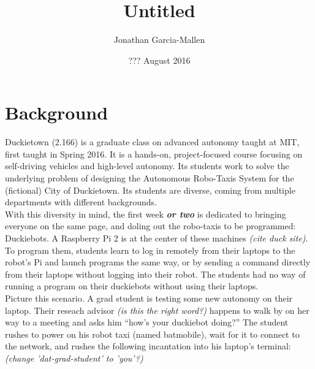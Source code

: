 \documentclass{article}
\title{Untitled}
\author{Jonathan Garcia-Mallen}
\date{??? August 2016}
\begin{document}
\lstset{language=Bash,
  numbers=left,
  stepnumber=3,    
  firstnumber=1,
  numberfirstline=true
}
\maketitle
\tableofcontents
\section{Background } 
Duckietown (2.166) is a graduate class on advanced autonomy taught at MIT, first taught in Spring 2016. It is a hands-on, project-focused course focusing on self-driving vehicles and high-level autonomy. Its students work to solve the underlying problem of designing the Autonomous Robo-Taxis System for the (fictional) City of Duckietown. Its students are diverse, coming from multiple departments with different backgrounds. 
\\
With this diversity in mind, the first week \textit{\textbf{or two}} is dedicated to bringing everyone on the same page, and doling out the robo-taxis to be programmed: Duckiebots. A Raspberry Pi 2 is at the center of these machines \textit{(cite duck site)}. To program them, students learn to log in remotely from their laptops to the robot's Pi and launch programs the same way, or by sending a command directly from their laptops without logging into their robot. The students had no way of running a program on their duckiebots without using their laptops.
\\
Picture this scenario. A grad student is testing some new autonomy on their laptop. Their reseach advisor \textit{(is this the right word?)} happens to walk by on her way to a meeting and asks him ``how's your duckiebot doing?'' The student rushes to power on his robot taxi (named batmobile), wait for it to connect to the network, and rushes the following incantation into his laptop's terminal: \textit{(change 'dat-grad-student' to 'you'?)}
\end{document}
